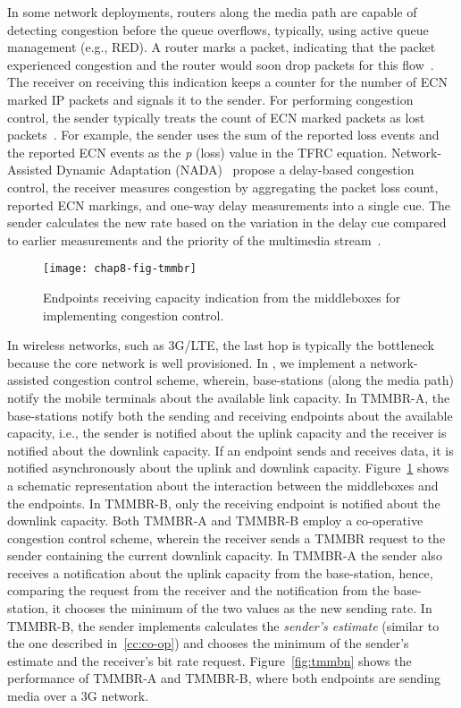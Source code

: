 In some network deployments, routers along the media path are capable of
detecting congestion before the queue overflows, typically, using active queue
management (e.g., RED). A router marks a packet, indicating that the packet
experienced congestion and the router would soon drop packets for this
flow~\cite{rfc3168}. The receiver on receiving this indication keeps a counter
for the number of ECN marked IP packets and signals it to the sender. For
performing congestion control, the sender typically treats the count of ECN
marked packets as lost packets~\cite{rfc6679}. For example, the sender uses
the sum of the reported loss events and the reported ECN events as the
\emph{p} (loss) value in the TFRC equation. Network-Assisted Dynamic
Adaptation (NADA)~\cite{rmcat-nada} propose a delay-based congestion control,
the receiver measures congestion by aggregating the packet loss count,
reported ECN markings, and one-way delay measurements into a single cue. The
sender calculates the new rate based on the variation in the delay cue
compared to earlier measurements and the priority of the multimedia
stream~\cite{pv-nada}.

\begin{figure}
\texttt{[image: chap8-fig-tmmbr]}
  \caption{Endpoints receiving capacity indication from the middleboxes for
  implementing congestion control.}
\label{fig:cc:tmmbrab}
\end{figure}

In wireless networks, such as 3G/LTE, the last hop is typically the bottleneck
because the core network is well provisioned. In , we
implement a network-assisted congestion control scheme, wherein, base-stations
(along the media path) notify the mobile terminals about the available link
capacity. In TMMBR-A, the base-stations notify both the sending and receiving
endpoints about the available capacity, i.e., the sender is notified about the
uplink capacity and the receiver is notified about the downlink capacity. If
an endpoint sends and receives data, it is notified asynchronously about the
uplink and downlink capacity. Figure~\ref{fig:cc:tmmbrab} shows a schematic
representation about the interaction between the middleboxes and the
endpoints. In TMMBR-B, only the receiving endpoint is notified about the
downlink capacity. Both TMMBR-A and TMMBR-B employ a co-operative congestion
control scheme, wherein the receiver sends a TMMBR request to the sender
containing the current downlink capacity. In TMMBR-A the sender also receives
a notification about the uplink capacity from the base-station, hence,
comparing the request from the receiver and the notification from the
base-station, it chooses the minimum of the two values as the new sending
rate. In TMMBR-B, the sender implements calculates the \emph{sender's
estimate} (similar to the one described in~\ref{cc:co-op}) and chooses the
minimum of the sender's estimate and the receiver's bit rate request.
Figure~\ref{fig:tmmbn} shows the performance of TMMBR-A and TMMBR-B, where
both endpoints are sending media over a 3G network.

